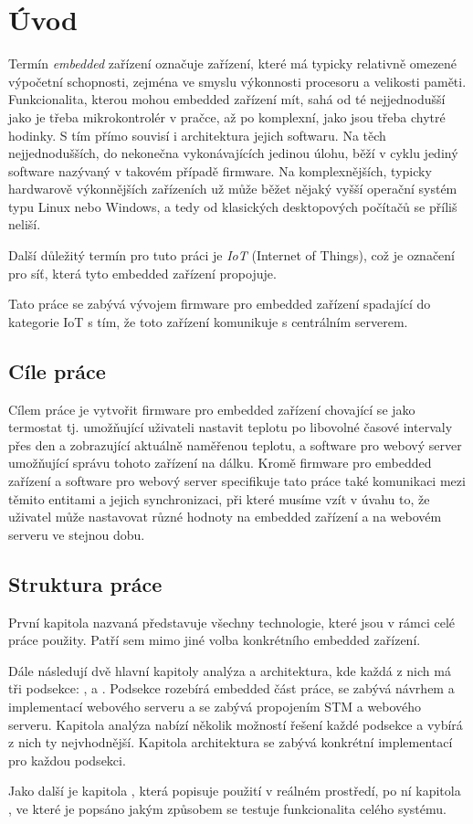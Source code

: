 \chapter*{Úvod}

Termín \emph{embedded} zařízení označuje zařízení, které má typicky relativně omezené výpočetní schopnosti,
zejména ve smyslu výkonnosti procesoru a velikosti paměti.
Funkcionalita, kterou mohou embedded zařízení mít, sahá od té nejjednodušší jako je třeba mikrokontrolér
v pračce, až po komplexní, jako jsou třeba chytré hodinky.
S tím přímo souvisí i architektura jejich softwaru.
Na těch nejjednodušších, do nekonečna vykonávajících jedinou úlohu, běží v cyklu jediný software
nazývaný v takovém případě firmware.
Na komplexnějších, typicky hardwarově výkonnějších zařízeních už může běžet nějaký vyšší operační systém
typu Linux nebo Windows, a tedy od klasických desktopových počítačů se příliš neliší.

Další důležitý termín pro tuto práci je \emph{IoT} (Internet of Things), což je označení pro síť,
která tyto embedded zařízení propojuje.

Tato práce se zabývá vývojem firmware pro embedded zařízení spadající do kategorie IoT s tím,
že toto zařízení komunikuje s centrálním serverem.


\section{Cíle práce}
Cílem práce je vytvořit firmware pro embedded zařízení chovající se jako termostat tj. umožňující
uživateli nastavit teplotu po libovolné časové intervaly přes den a zobrazující aktuálně naměřenou
teplotu, a software pro webový server umožňující správu tohoto zařízení na dálku.
Kromě firmware pro embedded zařízení a software pro webový server specifikuje tato práce také
komunikaci mezi těmito entitami a jejich synchronizaci, při které musíme vzít v úvahu to, že uživatel
může nastavovat různé hodnoty na embedded zařízení a na webovém serveru ve stejnou dobu.

\section{Struktura práce}
První kapitola nazvaná  představuje všechny technologie, které jsou v rámci celé práce
použity.
Patří sem mimo jiné volba konkrétního embedded zařízení.

Dále následují dvě hlavní kapitoly analýza a architektura, kde každá z nich má tři podsekce: ,
 a .
Podsekce  rozebírá embedded část práce,  se zabývá návrhem a implementací webového serveru
a  se zabývá propojením STM a webového serveru.
Kapitola analýza nabízí několik možností řešení každé podsekce a vybírá z nich ty nejvhodnější.
Kapitola architektura se zabývá konkrétní implementací pro každou podsekci.

Jako další je kapitola , která popisuje použití v reálném prostředí, po ní kapitola
, ve které je popsáno jakým způsobem se testuje funkcionalita celého systému.

